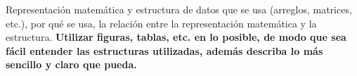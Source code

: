 Representación matemática y estructura de datos que se usa (arreglos,
matrices, etc.), por qué se usa, la relación entre la representación
matemática y la estructura. \textbf{Utilizar figuras, tablas, etc.
en lo posible, de modo que sea fácil entender las estructuras utilizadas,
además describa lo más sencillo y claro que pueda.}
